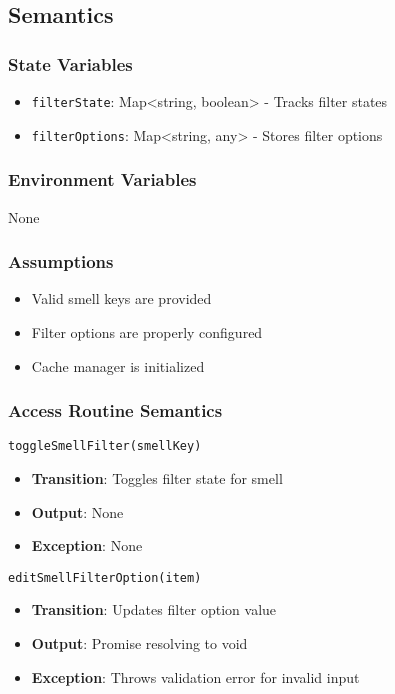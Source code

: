 \documentclass[12pt, titlepage]{article}
\begin{document}
\subsection{Semantics}

\subsubsection{State Variables}
\begin{itemize}
\item \texttt{filterState}: Map<string, boolean> - Tracks filter states
\item \texttt{filterOptions}: Map<string, any> - Stores filter options
\end{itemize}

\subsubsection{Environment Variables}
None

\subsubsection{Assumptions}
\begin{itemize}
\item Valid smell keys are provided
\item Filter options are properly configured
\item Cache manager is initialized
\end{itemize}

\subsubsection{Access Routine Semantics}
\texttt{toggleSmellFilter(smellKey)}
\begin{itemize}
\item \textbf{Transition}: Toggles filter state for smell
\item \textbf{Output}: None
\item \textbf{Exception}: None
\end{itemize}

\texttt{editSmellFilterOption(item)}
\begin{itemize}
\item \textbf{Transition}: Updates filter option value
\item \textbf{Output}: Promise resolving to void
\item \textbf{Exception}: Throws validation error for invalid input
\end{itemize}
\end{document}
